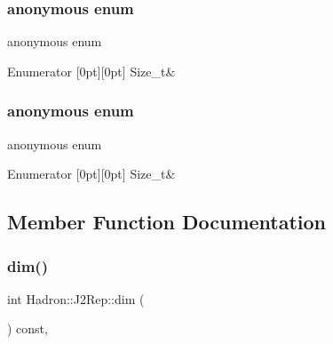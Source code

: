 \subsubsection{\texorpdfstring{anonymous enum}{anonymous enum}}
{\footnotesize\ttfamily anonymous enum}

\begin{DoxyEnumFields}{Enumerator}
[0pt][0pt]{}\mbox{\label{structHadron_1_1J2Rep_ada5bd88745be9a9b3c8e852aebd01725af373966e0fdf5720e95e95a61443a265}} 
Size\+\_\+t&\\
\hline

\end{DoxyEnumFields}
\mbox{\label{structHadron_1_1J2Rep_ada5bd88745be9a9b3c8e852aebd01725}} 
\subsubsection{\texorpdfstring{anonymous enum}{anonymous enum}}
{\footnotesize\ttfamily anonymous enum}

\begin{DoxyEnumFields}{Enumerator}
[0pt][0pt]{}\mbox{\label{structHadron_1_1J2Rep_ada5bd88745be9a9b3c8e852aebd01725af373966e0fdf5720e95e95a61443a265}} 
Size\+\_\+t&\\
\hline

\end{DoxyEnumFields}


\subsection{Member Function Documentation}
\mbox{\label{structHadron_1_1J2Rep_a9bbfe6d82db1e96beda068411ff79371}} 
\subsubsection{\texorpdfstring{dim()}{dim()}\hspace{0.1cm}{\footnotesize\ttfamily [1/3]}}
{\footnotesize\ttfamily int Hadron\+::\+J2\+Rep\+::dim (\begin{DoxyParamCaption}{ }\end{DoxyParamCaption}) const\hspace{0.3cm}{\ttfamily [inline]}, {\ttfamily [virtual]}}



